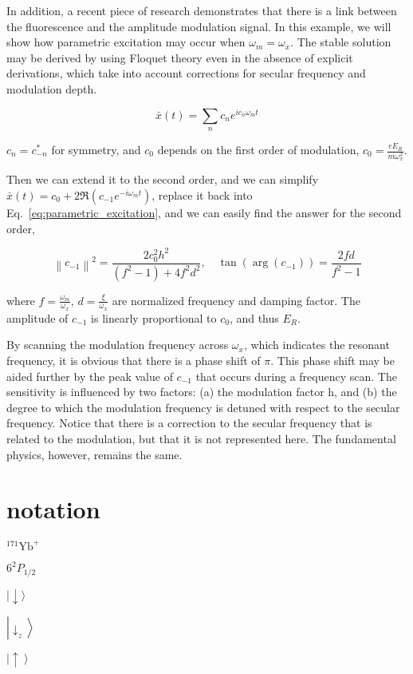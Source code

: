 In addition, a recent piece of research demonstrates that there is a link between the fluorescence and the amplitude modulation signal. In this example, we will show how parametric excitation may occur when \(\omega_m=\omega_x\). The stable solution may be derived by using Floquet theory even in the absence of explicit derivations, which take into account corrections for secular frequency and modulation depth.

\begin{equation}
    \bar{x}(t)=\sum_nc_ne^{ic_n\omega_mt}
\end{equation}

\(c_n=c_{-n}^*\) for symmetry, and \(c_0\) depends on the first order of modulation, \(c_0=\frac{eE_R}{m\omega_x^2}\).

Then we can extend it to the second order, and we can simplify $\bar{x}(t)=c_0+2 \Re\left(c_{-1} e^{-i \omega_m t}\right)$, replace it back into Eq.~\ref{eq:parametric_excitation}, and we can easily find the answer for the second order,

\begin{equation}
    \left\|c_{-1}\right\|^2=\frac{2 c_0^2 h^2}{\left(f^2-1\right)+4 f^2 d^2}, \quad \tan \left(\arg \left(c_{-1}\right)\right)=\frac{2 f d}{f^2-1}
\end{equation}

where \(f=\frac{\omega_m}{\omega_x},\, d=\frac{\xi}{\omega_x}\) are normalized frequency and damping factor. The amplitude of \(c_{-1}\) is linearly proportional to \(c_0\), and thus \(E_R\).

By scanning the modulation frequency across \(\omega_x\), which indicates the resonant frequency, it is obvious that there is a phase shift of \(\pi\). This phase shift may be aided further by the peak value of \(c_{-1}\) that occurs during a frequency scan. The sensitivity is influenced by two factors: (a) the modulation factor h, and (b) the degree to which the modulation frequency is detuned with respect to the secular frequency. Notice that there is a correction to the secular frequency that is related to the modulation, but that it is not represented here. The fundamental physics, however, remains the same.


\section{notation}

${ }^{171} \mathrm{Yb}^{+}$

$6^2 P_{1 / 2}$

$|\downarrow\rangle$

$\left|\downarrow_z\right\rangle$

$\left|\uparrow\right\rangle$

